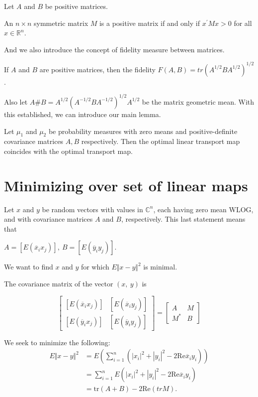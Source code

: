 Let $A$ and $B$ be positive matrices.

\begin{definition}
	An $n\times n$ symmetric matrix $M$ is a positive matrix if and only if $x^{'} M x>0$ for all $x\in \mathbb{R}^n$.
\end{definition}

And we also introduce the concept of fidelity measure between matrices. 

\begin{definition}[Fidelity]
	If $A$ and $B$ are positive matrices, then the fidelity $F(A,B) = tr(A^{1/2}BA^{1/2})^{1/2}$.
\end{definition}

Also let $A\#B=A^{1/2}(A^{-1/2}BA^{-1/2})^{1/2}A^{1/2}$ be the matrix geometric mean. With this established, we can introduce our main lemma.

\begin{lemma}
	Let $\mu_1$ and $\mu_2$ be probability measures with zero means and positive-definite covariance matrices $A,B$ respectively. Then the optimal linear transport map coincides with the optimal transport map.
\end{lemma}

\section*{Minimizing over set of linear maps \cite{Bhatia2019}}
Let $x$ and $y$ be random vectors with values in $\mathbb{C}^{n}$, each having zero mean WLOG, and with covariance matrices $A$ and $B$, respectively. This last statement means that
\begin{center}
	$A=[E(\overline{x}_{i}x_{j})],\ B=[E(\overline{y}_{i}y_{j})]$.
\end{center}

We want to find $x$ and $y$ for which $E\Vert x-y\Vert^{2}$ is minimal.

The covariance matrix of the vector $(x,\ y)$ is

$$
\left[ \begin{matrix}
	[E(\overline{x}_{i}x_{j})] & [E(\overline{x}_{i}y_{j})] \\
	[E(\overline{y}_{i}x_{j})] & [E(\overline{y}_{i}y_{j})]
\end{matrix}\right]
=
\left[ \begin{matrix}
	A & M \\
	M^{*} & B
\end{matrix}\right]
$$

We seek to minimize the following:
\begin{align*}
E\Vert x-y\Vert^{2} &= E(\displaystyle \sum_{i=1}^{n}(|x_{i}|^{2}+|y_{i}|^{2}-2\mathrm{Re}\overline{x}_{i}y_{i})) \\
&= \sum_{i=1}^{n}E(|x_{i}|^{2}+|y_{i}|^{2}-2\mathrm{Re}\overline{x}_{i}y_{i}) \\
&= \mathrm{tr}(A+B)-2\mathrm{Re} (tr M).
\end{align*}


